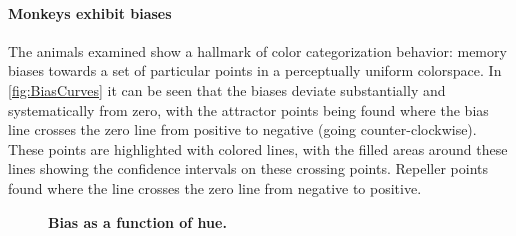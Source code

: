 
\paragraph{Monkeys exhibit biases} %

The animals examined show a hallmark of color categorization behavior: memory biases towards a set of particular points in a perceptually uniform colorspace.
In \autoref{fig:BiasCurves} it can be seen that the biases deviate substantially and systematically from zero, with the attractor points being found where the bias line crosses the zero line from positive to negative (going counter-clockwise). These points are highlighted with colored lines, with the filled areas around these lines showing the confidence intervals on these crossing points. Repeller points found where the line crosses the zero line from negative to positive.

\begin{figure}

\caption{\textbf{Bias as a function of hue.} 
}
\label{fig:BiasCurves}
\end{figure}

